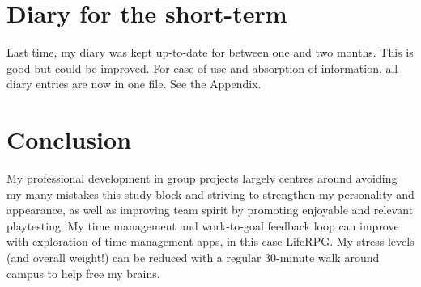 \documentclass{scrartcl}
\begin{document}



\section{Diary for the short-term} %
Last time, my diary was kept up-to-date for between one and two months. This is good but could be improved. For ease of use and absorption of information, all diary entries are now in one file. See the Appendix.

\section{Conclusion} %
My professional development in group projects largely centres around avoiding my many mistakes this study block and striving to strengthen my personality and appearance, as well as improving team spirit by promoting enjoyable and relevant playtesting. My time management and work-to-goal feedback loop can improve with exploration of time management apps, in this case LifeRPG. My stress levels (and overall weight!) can be reduced with a regular 30-minute walk around campus to help free my brains.

\newpage
\end{document}
